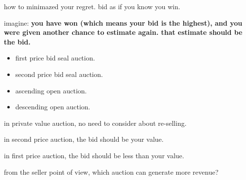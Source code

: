 \documentclass[12pt,a4paper]{article}
\begin{document}
how to minimazed your regret. bid as if you know you win.

\vspace{0.5cm}

\noindent imagine:  \textbf{you have won (which means your bid is the highest), and you were given another chance to estimate again. that estimate should be the bid.}

\vspace{0.5cm}
\begin{itemize}
\item first price bid seal auction.
\item second price bid seal auction.
\item ascending open auction.
\item descending open auction.
\end{itemize}

in private value auction, no need to consider about re-selling.

in second price auction, the bid should be your value.

in first price auction, the bid should be less than your value.

from the seller point of view, which auction can generate more revenue?
\end{document}
